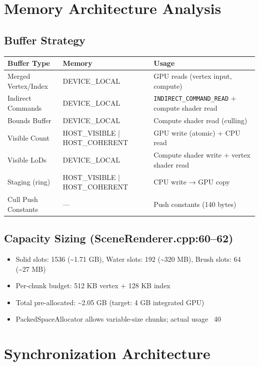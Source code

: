 \documentclass[11pt,a4paper]{article}
\begin{document}
\section{Memory Architecture Analysis}

\subsection{Buffer Strategy}
\begin{longtable}{@{}lll@{}}
\toprule
\textbf{Buffer Type} & \textbf{Memory} & \textbf{Usage} \\
\midrule
Merged Vertex/Index & DEVICE\_LOCAL & GPU reads (vertex input, compute) \\
Indirect Commands & DEVICE\_LOCAL & \texttt{INDIRECT\_COMMAND\_READ} + compute shader read \\
Bounds Buffer & DEVICE\_LOCAL & Compute shader read (culling) \\
Visible Count & HOST\_VISIBLE | HOST\_COHERENT & GPU write (atomic) + CPU read \\
Visible LoDs & DEVICE\_LOCAL & Compute shader write + vertex shader read \\
Staging (ring) & HOST\_VISIBLE | HOST\_COHERENT & CPU write → GPU copy \\
Cull Push Constants & — & Push constants (140 bytes) \\
\bottomrule
\end{longtable}

\subsection{Capacity Sizing (SceneRenderer.cpp:60–62)}
\begin{itemize}
    \item Solid slots: 1536 (\textasciitilde1.71 GB), Water slots: 192 (\textasciitilde320 MB), Brush slots: 64 (\textasciitilde27 MB)
    \item Per-chunk budget: 512 KB vertex + 128 KB index
    \item Total pre-allocated: \textasciitilde2.05 GB (target: 4 GB integrated GPU)
    \item PackedSpaceAllocator allows variable-size chunks; actual usage ~40%
\end{itemize}

\section{Synchronization Architecture}
\end{document}
